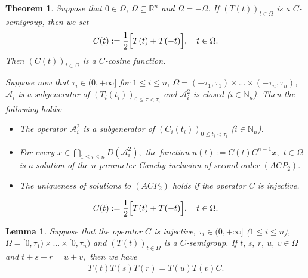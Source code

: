 \documentclass[10pt,a4paper]{amsart}
\newtheorem{thm}{Theorem}
\newtheorem{lem}{Lemma}
\begin{document}
\begin{thm}\label{emoj}
Suppose that $0\in \Omega$, $\Omega  \subseteq {\mathbb R}^{n} $ and $\Omega=-\Omega.$ If $(T(t))_{t\in \Omega}$ is a $C$-semigroup, then we set
\begin{align}\label{3456}
C(t):=\frac{1}{2}\Bigl[ T(t)+T(-t)\Bigr],\quad t\in \Omega .
\end{align}
Then $(C(t))_{t\in \Omega}$ is a $C$-cosine function. 

Suppose now that $\tau_{i}\in (0,+\infty]$ for $1\leq i \leq n$, $\Omega =(-\tau_{1},\tau_{1}) \times ... \times (-\tau_{n},\tau_{n})$, ${\mathcal A}_{i}$ is a subgenerator of $(T_{i}(t_{i}) )_{0\leq \tau <\tau_{i}}$ 
and
${\mathcal A}_{i}^{2}$ is closed ($i\in  {\mathbb N}_{n}$). Then the following holds:
\begin{itemize}
\item[(i)] The operator
${\mathcal A}_{i}^{2}$ is
a subgenerator of
$(C_{i}(t_{i}) )_{0\leq t_{i} <\tau_{i}}$ ($i\in  {\mathbb N}_{n}$).
\item[(ii)] For every $x\in \bigcap_{1\leq i \leq n}D({\mathcal A}_{i}^{2}),$ the function $u(t):=C(t)C^{n-1}x,$ $t\in \Omega$ is a solution of the $n$-parameter Cauchy inclusion of second order $(ACP_{2}).$ 
\item[(iii)] The uniqueness of solutions to $(ACP_{2})$ holds if the operator $C$ is injective.
\end{itemize}
\end{thm}

\begin{align}
C(t):=\frac{1}{2}\Bigl[ T(t)+T(-t)\Bigr],\quad t\in \Omega .
\end{align}

\begin{lem}\label{mata}
Suppose that the operator $C$ is injective, $\tau_{i}\in (0,+\infty]$ ($1\leq i \leq n$), $\Omega =[0,\tau_{1}) \times ... \times [0,\tau_{n})$ and $(T(t))_{t\in \Omega}$ 
is a $C$-semigroup. If $t,\,s,\ r,\ u,\ v \in \Omega$ and $t+s+r=u+v,$ then we have
\begin{align}\label{bjeda}
T(t)T(s)T(r)=T(u)T(v)C.
\end{align}
\end{lem}
\end{document}
